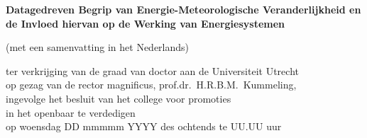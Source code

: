 \begin{titlepage}
\begin{center}
        {\makeatletter
                \titlestyle\bfseries\Huge\@title
                \makeatother}

        {\makeatletter
                \ifx\@subtitle\undefined\else
                \bigskip
                \titlefont\titleshape\LARGE\@subtitle
                \fi
                \makeatother}

        \vfill

        {\LARGE\titlefont\bfseries Datagedreven Begrip van Energie-Meteorologische Veranderlijkheid en de Invloed hiervan op de Werking van Energiesystemen}


        (met een samenvatting in het Nederlands)

        \bigskip
        \bigskip



        ter verkrijging van de graad van doctor aan de Universiteit Utrecht\\[\medskipamount]
        op gezag van de rector magnificus, prof.dr.\ H.R.B.M.~Kummeling,\\[\medskipamount]
        ingevolge het besluit van het college voor promoties\\[\medskipamount]
        in het openbaar te verdedigen\\[\medskipamount]
        op woensdag DD mmmmm YYYY  des ochtends te UU.UU uur

        \bigskip
        \bigskip


\end{center}
\end{titlepage}

